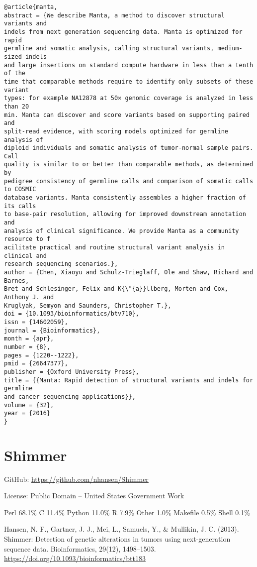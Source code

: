\documentclass[]{article}
\begin{document}
\begin{verbatim}
@article{manta,
abstract = {We describe Manta, a method to discover structural variants and
indels from next generation sequencing data. Manta is optimized for rapid
germline and somatic analysis, calling structural variants, medium-sized indels
and large insertions on standard compute hardware in less than a tenth of the
time that comparable methods require to identify only subsets of these variant
types: for example NA12878 at 50× genomic coverage is analyzed in less than 20
min. Manta can discover and score variants based on supporting paired and
split-read evidence, with scoring models optimized for germline analysis of
diploid individuals and somatic analysis of tumor-normal sample pairs. Call
quality is similar to or better than comparable methods, as determined by
pedigree consistency of germline calls and comparison of somatic calls to COSMIC
database variants. Manta consistently assembles a higher fraction of its calls
to base-pair resolution, allowing for improved downstream annotation and
analysis of clinical significance. We provide Manta as a community resource to f
acilitate practical and routine structural variant analysis in clinical and
research sequencing scenarios.},
author = {Chen, Xiaoyu and Schulz-Trieglaff, Ole and Shaw, Richard and Barnes,
Bret and Schlesinger, Felix and K{\"{a}}llberg, Morten and Cox, Anthony J. and
Kruglyak, Semyon and Saunders, Christopher T.},
doi = {10.1093/bioinformatics/btv710},
issn = {14602059},
journal = {Bioinformatics},
month = {apr},
number = {8},
pages = {1220--1222},
pmid = {26647377},
publisher = {Oxford University Press},
title = {{Manta: Rapid detection of structural variants and indels for germline
and cancer sequencing applications}},
volume = {32},
year = {2016}
}
\end{verbatim}

\section{Shimmer}

GitHub: \url{https://github.com/nhansen/Shimmer}

License: Public Domain -- United States Government Work

Perl 68.1\% C 11.4\% Python 11.0\% R 7.9\% Other 1.0\% Makefile 0.5\% Shell 0.1\%

Hansen, N. F., Gartner, J. J., Mei, L., Samuels, Y., \& Mullikin, J. C. (2013). Shimmer: Detection of genetic alterations in tumors using next-generation sequence data. Bioinformatics, 29(12), 1498–1503. \url{https://doi.org/10.1093/bioinformatics/btt183}
\end{document}
